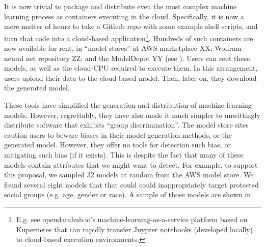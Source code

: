   It is now trivial to package and distribute even
  the most complex machine learning process
  as containers executing in the cloud.
   Specifically,
   it is now a mere matter of hours to take a Github repo with some example shell  scripts, and turn that code into a cloud-based application\footnote{E.g. see opendatahub.io's machine-learning-as-a-service platform based on Kupernetes that can rapidly transfer Juypter notebooks (developed locally)  to cloud-based
  execution environments.}.
  Hundreds of
  such containers are now available for rent, in
  ``model stores'' at  AWS marketplace XX;
  Wolfram neural net repository ZZ;  and  the  ModelDepot YY
(see ).  Users can
rent these models, as well as the cloud-CPU required
to execute them. In this arrangement, users upload their data to the cloud-based model. Then, later on,
they download the generated model. 

These tools have simplified the generation and distribution of machine learning models.
However, regrettably, they have also made it much simpler to 
unwittingly  distribute  software that exhibits
``group discrimination''.  The model store sites caution
users to beware biases in their model generation methods, or the generated model. However, they offer no tools for detection   such bias, or mitigating such bias (if it exists). This is despite the fact
that many of these models contain attributes that we might want to detect.
For example, to support this proposal, we sampled 32 models at random from
the AWS model store. We found several eight models that  that could could inappropriately target protected social groups (e.g. age, gender or race). A sample of those models are shown in 

